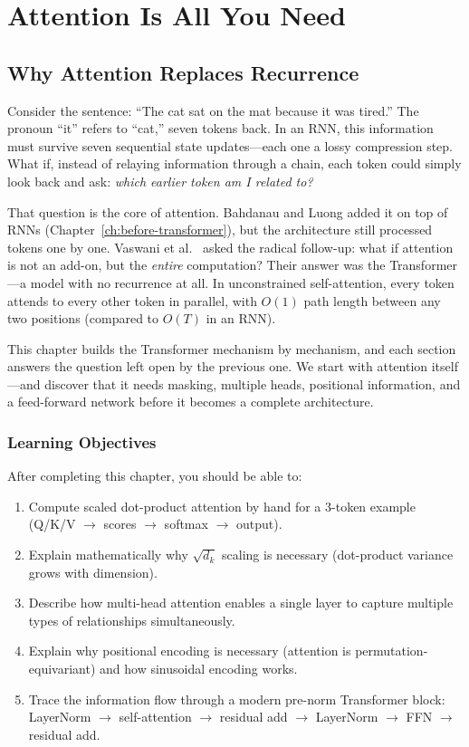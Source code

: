 \chapter{Attention Is All You Need}
\label{ch:attention}

\section{Why Attention Replaces Recurrence}

Consider the sentence: ``The cat sat on the mat because it was tired.'' The pronoun ``it'' refers to ``cat,'' seven tokens back. In an RNN, this information must survive seven sequential state updates---each one a lossy compression step. What if, instead of relaying information through a chain, each token could simply look back and ask: \emph{which earlier token am I related to?}

That question is the core of attention. Bahdanau and Luong added it on top of RNNs (Chapter~\ref{ch:before-transformer}), but the architecture still processed tokens one by one. Vaswani et al.~\cite{vaswani2017attention} asked the radical follow-up: what if attention is not an add-on, but the \emph{entire} computation? Their answer was the Transformer---a model with no recurrence at all. In unconstrained self-attention, every token attends to every other token in parallel, with $O(1)$ path length between any two positions (compared to $O(T)$ in an RNN).

This chapter builds the Transformer mechanism by mechanism, and each section answers the question left open by the previous one. We start with attention itself---and discover that it needs masking, multiple heads, positional information, and a feed-forward network before it becomes a complete architecture.

\subsection*{Learning Objectives}

After completing this chapter, you should be able to:

\begin{enumerate}
    \item Compute scaled dot-product attention by hand for a 3-token example (Q/K/V $\to$ scores $\to$ softmax $\to$ output).
    \item Explain mathematically why $\sqrt{d_k}$ scaling is necessary (dot-product variance grows with dimension).
    \item Describe how multi-head attention enables a single layer to capture multiple types of relationships simultaneously.
    \item Explain why positional encoding is necessary (attention is permutation-equivariant) and how sinusoidal encoding works.
    \item Trace the information flow through a modern pre-norm Transformer block: LayerNorm $\to$ self-attention $\to$ residual add $\to$ LayerNorm $\to$ FFN $\to$ residual add.
\end{enumerate}

